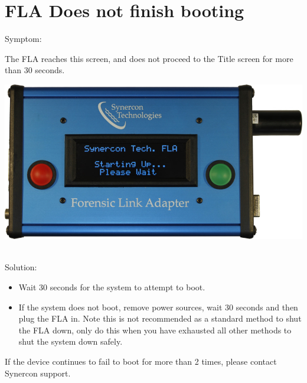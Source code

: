 \documentclass[11pt, oneside]{book}
\begin{document}
\section{FLA Does not finish booting}
Symptom:\\
\noindent\begin{minipage}{0.45\textwidth}%
The FLA reaches this screen, and does not proceed to the Title screen for more than 30 seconds.
\end{minipage}%
\hfill%
\begin{minipage}{0.45\textwidth}
\includegraphics[width=\linewidth]{../media/fla_screens/ethernet_and_others/boot/please_wait}
\end{minipage}\\
Solution:\\
\begin{itemize}
\item Wait 30 seconds for the system to attempt to boot.
\item If the system does not boot, remove power sources, wait 30 seconds and then plug the FLA in. Note this is not recommended as a standard method to shut the FLA down, only do this when you have exhausted all other methods to shut the system down safely.
\end{itemize}
If the device continues to fail to boot for more than 2 times, please contact Synercon support.
\end{document}
